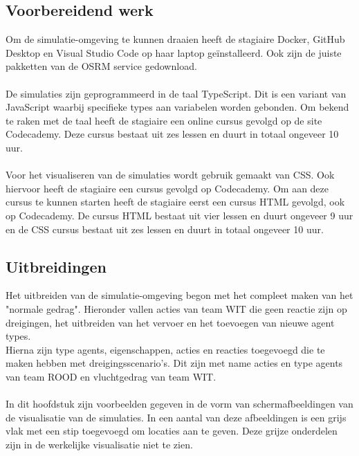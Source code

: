 \documentclass[12pt, letterpaper]{article}
\begin{document}
\subsection{Voorbereidend werk}
Om de simulatie-omgeving te kunnen draaien heeft de stagiaire Docker, GitHub Desktop en Visual Studio Code op haar laptop geïnstalleerd. Ook zijn de juiste pakketten van de OSRM service gedownload.\\ \\
De simulaties zijn geprogrammeerd in de taal TypeScript. Dit is een variant van JavaScript waarbij specifieke types aan variabelen worden gebonden. Om bekend te raken met de taal heeft de stagiaire een online cursus gevolgd op de site Codecademy. Deze cursus bestaat uit zes lessen en duurt in totaal ongeveer 10 uur. \\ \\
Voor het visualiseren van de simulaties wordt gebruik gemaakt van CSS. Ook hiervoor heeft de stagiaire een cursus gevolgd op Codecademy. Om aan deze cursus te kunnen starten heeft de stagiaire eerst een cursus HTML gevolgd, ook op Codecademy. De cursus HTML bestaat uit vier lessen en duurt ongeveer 9 uur en de CSS cursus bestaat uit  zes lessen en duurt in totaal ongeveer 10 uur.
\subsection{Uitbreidingen}
Het uitbreiden van de simulatie-omgeving begon met het compleet maken van het "normale gedrag". Hieronder vallen acties van team WIT die geen reactie zijn op dreigingen, het uitbreiden van het vervoer en het toevoegen van nieuwe agent types. \\
Hierna zijn type agents, eigenschappen, acties en reacties toegevoegd die te maken hebben met dreigingsscenario's. Dit zijn met name acties en type agents van team ROOD en vluchtgedrag van team WIT.
\\ \\
In dit hoofdstuk zijn voorbeelden gegeven in de vorm van schermafbeeldingen van de visualisatie van de simulaties. In een aantal van deze afbeeldingen is een grijs vlak met een stip toegevoegd om locaties aan te geven. Deze grijze onderdelen zijn in de werkelijke visualisatie niet te zien.
\end{document}
